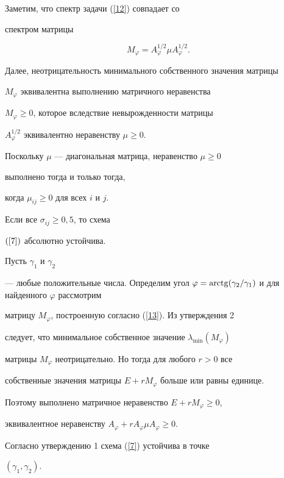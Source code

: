 \begin{pf}


Заметим, что спектр задачи (\ref{12}) совпадает со 


спектром матрицы


\begin{equation}


\label{13}


M_{\varphi}=A_{\varphi}^{1/2}\mu A_{\varphi}^{1/2}.


\end{equation}





Далее, неотрицательность минимального собственного значения матрицы


$M_{\varphi}$ эквивалентна выполнению матричного неравенства


$M_{\varphi} \ge 0$, которое вследствие невырожденности матрицы


$A_{\varphi}^{1/2}$ эквивалентно неравенству $\mu\ge 0$.


Поскольку $\mu$ --- диагональная матрица, неравенство $\mu\ge 0$


выполнено тогда и только тогда,


когда $\mu_{ij}\ge 0$ для всех $i$ и $j$.


\end{pf}





\begin{assrt}


Если все $\sigma_{ij}\ge 0,5$, то схема


$(\ref{7})$ абсолютно устойчива.


\end{assrt}





\begin{pf} Пусть $\gamma_{1}$ и $\gamma_{2}$


--- любые положительные числа. Определим угол $\varphi =


\arctg (\gamma_{2} /\gamma_{1})$ и для найденного $\varphi$ рассмотрим


матрицу $M_{\varphi}$, построенную согласно (\ref{13}). Из утверждения 2


следует, что минимальное собственное значение $\lambda_{\min}(M_{\varphi})$


матрицы $M_{\varphi}$ неотрицательно. Но тогда для любого $r>0$ все


собственные значения матрицы $E+rM_{\varphi}$ больше или равны единице.


Поэтому выполнено матричное неравенство $E+rM_{\varphi} \ge 0$,


эквивалентное неравенству $A_{\varphi} + rA_{\varphi}\mu A_{\varphi} \ge 0$.


Согласно утверждению 1 схема (\ref{7}) устойчива в точке


$(\gamma_{1},\gamma_{2})$.


\end{pf}






